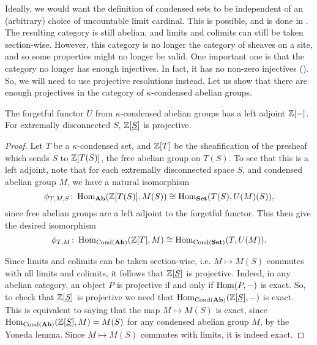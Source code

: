 \documentclass{article}
\DeclareMathOperator{\Cond}{Cond}
\begin{document}
Ideally, we would want the definition of condensed sets
to be independent of an (arbitrary) choice of uncountable
limit cardinal. This is possible, and is done
in \cite[Appendix to Lecture II]{Sch2019LecturesCM}. The resulting
category is still abelian, and limits and colimits
can still be taken section-wise. However, this category
is no longer the category of sheaves on a site, and so some
properties might no longer be valid. One important one
is that the category no longer has enough injectives. In fact,
it has no non-zero injectives (\cite{Sch2020AreTE}). So,
we will need to use projective resolutions instead.
Let us show that there are enough projectives in
the category of $\kappa$-condensed abelian groups.
\begin{lemma}
    The forgetful functor $U$ from $\kappa$-condensed
    abelian groups has a left adjoint $\mathbb{Z}[-]$.
    For extremally disconnected $S$, $\mathbb{Z}[\underline{S}]$
    is projective.
\end{lemma}
\begin{proof}
    Let $T$ be a $\kappa$-condensed set, and $\mathbb{Z}[T]$ be the sheafification of the presheaf
    which sends $S$ to $\mathbb{Z}[T(S)]$, the free abelian group on $T(S)$.
    To see that this is a left adjoint, note that for each extremally disconnected
    space $S$, and condensed abelian group $M$, we have a natural isomorphism
    \begin{equation*}
        \phi_{T, M, S}\colon \operatorname{Hom}_{\operatorname{\mathbf{Ab}}}(\mathbb{Z}[T(S)], M(S)) \cong \operatorname{Hom}_{\operatorname{\mathbf{Set}}}(T(S), U(M)(S)),
    \end{equation*}
    since free abelian groups are a left adjoint to the forgetful functor.
    This then give the desired isomorphism
    \begin{equation*}
        \phi_{T, M} \colon \Hom_{\Cond(\Ab)}(\bbZ[T], M) \cong \Hom_{\Cond(\Set)}(T, U(M)).
    \end{equation*}

    Since limits and colimits can be taken section-wise, i.e. $M \mapsto M(S)$
    commutes with all limits and colimits, it follows that $\mathbb{Z}[\underline{S}]$
    is projective. Indeed, in any abelian category, an object $P$ is
    projective if and only if $\operatorname{Hom}(P, -)$ is exact. So, to check that $\mathbb{Z}[\underline{S}]$
    is projective we need that $\Hom_{\Cond(\Ab)}(\bbZ[\underline{S}], -)$ is exact.
    This is equivalent to saying that the map $M \mapsto M(S)$
    is exact, since $\Hom_{\Cond(\Ab)}(\bbZ[\underline{S}], M) = M(S)$ for any
    condensed abelian group $M$, by the Yoneda lemma. Since $M \mapsto M(S)$
    commutes with limits, it is indeed exact.
\end{proof}
\end{document}
